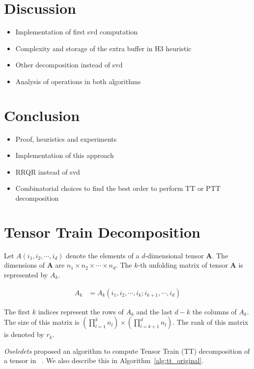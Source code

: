 \documentclass[runningheads]{llncs}
\newcommand{\tensor}[1]{\cal\textbf{#1}\xspace}
\begin{document}
\section{Discussion}
\label{sec:discussion}
\begin{itemize}
	\item Implementation of first svd computation
	\item Complexity and storage of the extra buffer in H3 heuristic
	\item Other decomposition instead of svd
	\item Analysis of operations in both algorithms
\end{itemize}
\section{Conclusion}
\label{sec:conclusion}
\begin{itemize}
	\item Proof, heuristics and experiments
	\item Implementation of this approach
	\item RRQR instead of svd
	\item Combinatorial choices to find the best order to perform TT or PTT decomposition
\end{itemize}




%
\section{Tensor Train Decomposition}
\label{sec:tt_sequential}

Let $A(i_1,i_2,\cdots, i_d)$ denote the elements of a $d$-dimensional tensor \tensor{A}. The dimensions of \tensor{A} are $n_1 \times n_2 \times \cdots \times n_d$. The $k$-th unfolding matrix of tensor \tensor{A} is represented by $A_k$.

\begin{align*}
A_k &= A_k(i_1, i_2,\cdots, i_k; i_{k+1},\cdots ,i_d)
\end{align*}

\noindent The first $k$ indices represent the rows of $A_k$ and the last $d-k$ the columns of $A_k$. The size of this matrix is $(\prod_{l=1}^{k}n_l)\times(\prod_{l=k+1}^{d}n_l)$. The rank of this matrix is denoted by $r_k$.

\noindent \textit{Oseledets} proposed an algorithm to compute Tensor Train (TT) decomposition of a tensor in ~\cite{tt}. We also describe this in Algorithm~\ref{alg:tt_original}. 
\end{document}
